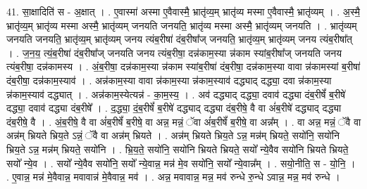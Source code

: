 \documentclass[17pt]{extarticle}
\begin{document}
41. सा॒क्षादिति॑ स - अ॒क्षात् । . ए॒वास्मा॑ अस्मा ए॒वैवास्मै॒ भ्रातृ॑व्य॒म् भ्रातृ॑व्य मस्मा ए॒वैवास्मै॒ भ्रातृ॑व्यम् । . अ॒स्मै॒ भ्रातृ॑व्य॒म् भ्रातृ॑व्य मस्मा अस्मै॒ भ्रातृ॑व्यम् जनयति जनयति॒ भ्रातृ॑व्य मस्मा अस्मै॒ भ्रातृ॑व्यम् जनयति । . भ्रातृ॑व्यम् जनयति जनयति॒ भ्रातृ॑व्य॒म् भ्रातृ॑व्यम् जनय त्यंब॒रीषा॑ दंब॒रीषा᳚ज् जनयति॒ भ्रातृ॑व्य॒म् भ्रातृ॑व्यम् जनय त्यंब॒रीषा᳚त् । . ज॒न॒य॒ त्यं॒ब॒रीषा॑ दंब॒रीषा᳚ज् जनयति जनय त्यंब॒रीषा॒ दन्न॑काम॒स्या न्न॑काम स्यांब॒रीषा᳚ज् जनयति जनय त्यंब॒रीषा॒ दन्न॑कामस्य । . अं॒ब॒रीषा॒ दन्न॑काम॒स्या न्न॑काम स्यांब॒रीषा॑ दंब॒रीषा॒ दन्न॑काम॒स्या वावा न्न॑कामस्यां ब॒रीषा॑ दंब॒रीषा॒ दन्न॑काम॒स्याव॑ । . अन्न॑काम॒स्या वावा न्न॑काम॒स्या न्न॑काम॒स्याव॑ दद्ध्याद् दद्ध्या॒ दवा न्न॑काम॒स्या न्न॑काम॒स्याव॑ दद्ध्यात् । . अन्न॑काम॒स्येत्यन्न॑ - का॒म॒स्य॒ । . अव॑ दद्ध्याद् दद्ध्या॒ दवाव॑ दद्ध्या दंब॒रीषें᳚ ब॒रीषे॑ दद्ध्या॒ दवाव॑ दद्ध्या दंब॒रीषे᳚ । . द॒द्ध्या॒ दं॒ब॒रीषें᳚ ब॒रीषे॑ दद्ध्याद् दद्ध्या दंब॒रीषे॒ वै वा अं॑ब॒रीषे॑ दद्ध्याद् दद्ध्या दंब॒रीषे॒ वै । . अं॒ब॒रीषे॒ वै वा अं॑ब॒रीषें᳚ ब॒रीषे॒ वा अन्न॒ मन्नं॒ ॅवा अं॑ब॒रीषें᳚ ब॒रीषे॒ वा अन्न᳚म् । . वा अन्न॒ मन्नं॒ ॅवै वा अन्न॑म् भ्रियते भ्रिय॒ते ऽन्नं॒ ॅवै वा अन्न॑म् भ्रियते । . अन्न॑म् भ्रियते भ्रिय॒ते ऽन्न॒ मन्न॑म् भ्रियते॒ सयो॑नि॒ सयो॑नि भ्रिय॒ते ऽन्न॒ मन्न॑म् भ्रियते॒ सयो॑नि । . भ्रि॒य॒ते॒ सयो॑नि॒ सयो॑नि भ्रियते भ्रियते॒ सयो᳚ न्ये॒वैव सयो॑नि भ्रियते भ्रियते॒ सयो᳚ न्ये॒व । . सयो᳚ न्ये॒वैव सयो॑नि॒ सयो᳚ न्ये॒वान्न॒ मन्न॑ मे॒व सयो॑नि॒ सयो᳚ न्ये॒वान्न᳚म् । . सयो॒नीति॒ स - यो॒नि॒ । . ए॒वान्न॒ मन्न॑ मे॒वैवान्न॒ मवावान्न॑ मे॒वैवान्न॒ मव॑ । . अन्न॒ मवावान्न॒ मन्न॒ मव॑ रुन्धे रु॒न्धे ऽवान्न॒ मन्न॒ मव॑ रुन्धे । \newline
\pagebreak
{}
\end{document}
